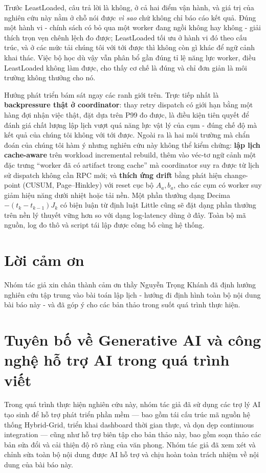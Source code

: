 \documentclass[final,5p,times,twocolumn]{elsarticle}
\begin{document}
Trước LeastLoaded, câu trả lời là không, ở cả hai điểm vận hành, và giá trị của nghiên cứu này nằm ở chỗ nói được \emph{vì sao} chứ không chỉ báo cáo kết quả. Đúng một hành vi - chính sách có bỏ qua một worker đang ngồi không hay không - giải thích trọn vẹn chênh lệch đo được; LeastLoaded tối ưu ở hành vi đó theo cấu trúc, và ở các mức tải chúng tôi với tới được thì không còn gì khác để ngữ cảnh khai thác. Việc bộ học dù vậy vẫn phân bổ gần đúng tỉ lệ năng lực worker, điều LeastLoaded không làm được, cho thấy cơ chế là đúng và chỉ đơn giản là môi trường không thưởng cho nó.

Hướng phát triển bám sát ngay các ranh giới trên. Trực tiếp nhất là \textbf{backpressure thật ở coordinator}: thay retry dispatch có giới hạn bằng một hàng đợi nhận việc thật, đặt dựa trên P99 đo được, là điều kiện tiên quyết để đánh giá chất lượng lập lịch vượt quá năng lực vật lý của cụm - đúng chế độ mà kết quả của chúng tôi không với tới được. Ngoài ra là hai môi trường mà chẩn đoán của chúng tôi hàm ý nhưng nghiên cứu này không thể kiểm chứng: \textbf{lập lịch cache-aware} trên workload incremental rebuild, thêm vào véc-tơ ngữ cảnh một đặc trưng ``worker đã có artifact trong cache'' mà coordinator suy ra được từ lịch sử dispatch không cần RPC mới; và \textbf{thích ứng drift} bằng phát hiện change-point (CUSUM, Page--Hinkley) với reset cục bộ $A_a,b_a$, cho các cụm có worker suy giảm hiệu năng dưới nhiệt hoặc tải nền. Một phần thưởng dạng Decima $-(t_k-t_{k-1})J_k$ có biện luận từ định luật Little cũng sẽ đặt dạng phần thưởng trên nền lý thuyết vững hơn so với dạng log-latency dùng ở đây. Toàn bộ mã nguồn, log đo thô và script tái lập được công bố cùng hệ thống.

\section*{Lời cảm ơn}

Nhóm tác giả xin chân thành cảm ơn thầy Nguyễn Trọng Khánh đã định hướng nghiên cứu tập trung vào bài toán lập lịch - hướng đi định hình toàn bộ nội dung bài báo này - và đã góp ý cho các bản thảo trong suốt quá trình thực hiện.

\section*{Tuyên bố về Generative AI và công nghệ hỗ trợ AI trong quá trình viết}

Trong quá trình thực hiện nghiên cứu này, nhóm tác giả đã sử dụng các trợ lý AI tạo sinh để hỗ trợ phát triển phần mềm --- bao gồm tái cấu trúc mã nguồn hệ thống Hybrid-Grid, triển khai dashboard thời gian thực, và dọn dẹp continuous integration --- cũng như hỗ trợ biên tập cho bản thảo này, bao gồm soạn thảo các bản sửa đổi và cải thiện độ rõ ràng của văn phong. Nhóm tác giả đã xem xét và chỉnh sửa toàn bộ nội dung được AI hỗ trợ và chịu hoàn toàn trách nhiệm về nội dung của bài báo này.
\end{document}

